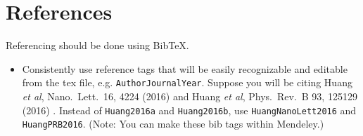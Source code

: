 \documentclass[aps,prb,twocolumn,superscriptaddress,floatfix,longbibliography]{revtex4-2}
\begin{document}
\section{\label{sec:References}References}

\noindent Referencing should be done using BibTeX.
\begin{itemize}[label=$\Box$]

\item Consistently use reference tags that will be easily recognizable and editable from the tex file, e.g. {\tt AuthorJournalYear}. Suppose you will be citing
Huang {\it et al}, Nano.\ Lett.\ 16, 4224 (2016) \cite{HuangNanoLett2016} and
Huang {\it et al}, Phys.\ Rev.\ B 93, 125129 (2016) \cite{HuangPRB2016}.
Instead of {\tt Huang2016a} and {\tt Huang2016b}, use {\tt HuangNanoLett2016} and {\tt HuangPRB2016}. (Note: You can make these bib tags within Mendeley.)


\end{itemize}
\end{document}
